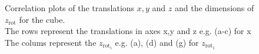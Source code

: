 \documentclass[10pt,a4paper]{article}
\newcommand{\rot}{\ensuremath{\text{rot}\xspace}}
\begin{document}
\begin{figure}[!ht]
\begin{subfigure}{0.3\textwidth}
	\caption{}
	\label{cfig_zz2}
\end{subfigure}
\caption{Correlation plots of the translations $x,y$ and $z$ and the dimensions of $z_{\rot}$ for the cube.\\
The rows represent the translations in axes x,y and z e.g. (a-c) for x\\
The colums represent the $z_{\rot_i}$ e.g. (a), (d) and (g) for $z_{\rot_1}$} \label{cube_corr_trans}
\end{figure}
\end{document}
